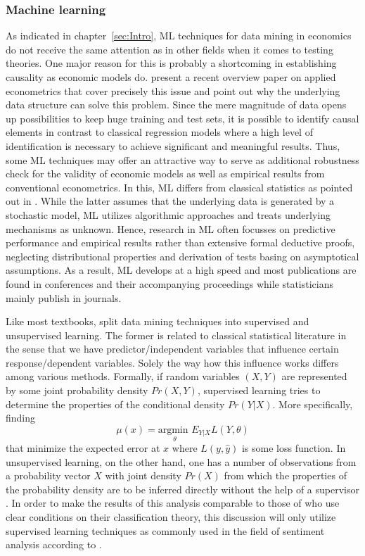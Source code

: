 \subsubsection{Machine learning} %

As indicated in chapter~\ref{sec:Intro}, ML techniques for data mining in economics do not receive the same attention as in other fields when it comes to testing theories. One major reason for this is probably a shortcoming in establishing causality as economic models do. \textcite{Athey.2017} present a recent overview paper on applied econometrics that cover precisely this issue and point out why the underlying data structure can solve this problem. Since the mere magnitude of data opens up possibilities to keep huge training and test sets, it is possible to identify causal elements in contrast to classical regression models where a high level of identification is necessary to achieve significant and meaningful results. Thus, some ML techniques may offer an attractive way to serve as additional robustness check for the validity of economic models as well as empirical results from conventional econometrics. In this, ML differs from classical statistics as pointed out in \textcite{Breiman.2001}. While the latter assumes that the underlying data is generated by a stochastic model, ML utilizes algorithmic approaches and treats underlying mechanisms as unknown. Hence, research in ML often focusses on predictive performance and empirical results rather than extensive formal deductive proofs, neglecting distributional properties and derivation of tests basing on asymptotical assumptions. As a result, ML develops at a high speed and most publications are found in conferences and their accompanying proceedings while statisticians mainly publish in journals. 

Like most textbooks, \textcite{Friedman.2001} split data mining techniques into supervised and unsupervised learning. The former is related to classical statistical literature in the sense that we have predictor/independent variables that influence certain response/dependent variables. Solely the way how this influence works differs among various methods. Formally, if random variables $(X,Y)$ are represented by some joint probability density $Pr(X,Y)$, supervised learning tries to determine the properties of the conditional density $Pr(Y|X) $. More specifically, finding 
%
\begin{equation*}
	\mu(x) = \underset{\theta}{\text{argmin }} E_{Y|X} L(Y,\theta)
\end{equation*}
%
that minimize the expected error at $x$ where $L(y,\hat{y})$ is some loss function. In unsupervised learning, on the other hand, one has a number of observations from a probability vector $X$ with joint density $Pr(X)$ from which the properties of the probability density are to be inferred directly without the help of a supervisor \parencite[pp.~485-486]{Friedman.2001}. In order to make the results of this analysis comparable to those of \textcite{Ellingsen.2003} who use clear conditions on their classification theory, this discussion will only utilize supervised learning techniques as commonly used in the field of sentiment analysis according to \textcite{Wiebe.1999}. 

